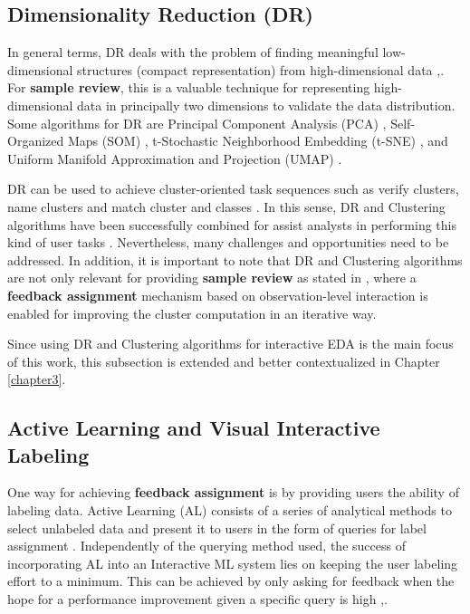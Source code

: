 \subsection{Dimensionality Reduction (DR)}
\label{subsection2.1.1}

In general terms, DR deals with the problem of finding meaningful low-dimensional structures (compact representation) from high-dimensional data \cite{Tenenbaum2000},\cite{Roweis2000}. For \textbf{sample review}, this is a valuable technique for representing high-dimensional data in principally two dimensions to validate the data distribution. Some algorithms for DR are Principal Component Analysis (PCA) \cite{PCA}, Self-Organized Maps (SOM) \cite{Kohonen1982Self-organizedMaps}, t-Stochastic Neighborhood Embedding (t-SNE) \cite{VanDerMaaten2008}, and Uniform Manifold Approximation and Projection (UMAP) \cite{McInnes2018}.

DR can be used to achieve cluster-oriented task sequences such as verify clusters, name clusters and match cluster and classes \cite{Brehmer2014VisualizingSequences}. In this sense, DR and Clustering algorithms have been successfully combined for assist analysts in performing this kind of user tasks \cite{Wenskovitch2018}. Nevertheless, many challenges and opportunities need to be addressed. In addition, it is important to note that DR and Clustering algorithms are not only relevant for providing \textbf{sample review} as stated in \cite{Wenskovitch2017}, where a \textbf{feedback assignment} mechanism based on observation-level interaction is enabled for improving the cluster computation in an iterative way. 

Since using DR and Clustering algorithms for interactive EDA is the main focus of this work, this subsection is extended and better contextualized in Chapter \ref{chapter3}. 

\subsection{Active Learning and Visual Interactive Labeling}
\label{subsection2.1.2}

One way for achieving \textbf{feedback assignment} is by providing users the ability of labeling data. Active Learning (AL) consists of a series of analytical methods to select unlabeled data and present it to users in the form of queries for label assignment \cite{Holzinger2016}. Independently of the querying method used, the success of incorporating AL into an Interactive ML system lies on keeping the user labeling effort to a minimum. This can be achieved by only asking for feedback when the hope for a performance improvement given a specific query is high \cite{Olsson2009},\cite{Tong2001}.

